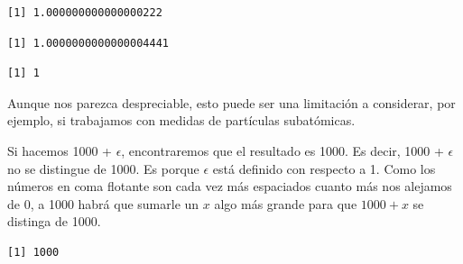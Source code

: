\documentclass[openany]{book}
\newenvironment{Shaded}{\begin{snugshade}}{\end{snugshade}}
\newcommand{\DataTypeTok}[1]{\textcolor[rgb]{0.13,0.29,0.53}{#1}}
\newcommand{\DecValTok}[1]{\textcolor[rgb]{0.00,0.00,0.81}{#1}}
\newcommand{\KeywordTok}[1]{\textcolor[rgb]{0.13,0.29,0.53}{\textbf{#1}}}
\newcommand{\NormalTok}[1]{#1}
\newcommand{\OperatorTok}[1]{\textcolor[rgb]{0.81,0.36,0.00}{\textbf{#1}}}
\newcommand{\StringTok}[1]{\textcolor[rgb]{0.31,0.60,0.02}{#1}}
\begin{document}
\begin{verbatim}
[1] 1.000000000000000222
\end{verbatim}

\begin{Shaded}
\end{Shaded}

\begin{verbatim}
[1] 1.0000000000000004441
\end{verbatim}

\begin{Shaded}
\end{Shaded}

\begin{verbatim}
[1] 1
\end{verbatim}

Aunque nos parezca despreciable, esto puede ser una limitación a considerar, por ejemplo, si trabajamos con medidas de partículas subatómicas.

Si hacemos 1000 + \(\epsilon\), encontraremos que el resultado es 1000. Es decir, 1000 + \(\epsilon\) no se distingue de 1000. Es porque \(\epsilon\) está definido con respecto a 1. Como los números en coma flotante son cada vez más espaciados cuanto más nos alejamos de 0, a 1000 habrá que sumarle un \(x\) algo más grande para que \(1000 + x\) se distinga de 1000.

\begin{Shaded}
\end{Shaded}

\begin{verbatim}
[1] 1000
\end{verbatim}
\end{document}
